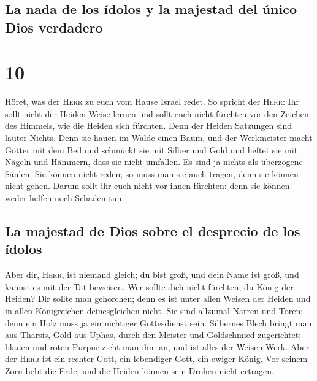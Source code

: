 \hypertarget{la-nada-de-los-uxeddolos-y-la-majestad-del-uxfanico-dios-verdadero}{%
\subsection{La nada de los ídolos y la majestad del único Dios
verdadero}\label{la-nada-de-los-uxeddolos-y-la-majestad-del-uxfanico-dios-verdadero}}

\hypertarget{section-9}{%
\section{10}\label{section-9}}

 Höret, was der \textsc{Herr} zu euch vom Hause Israel
redet.  So spricht der \textsc{Herr}: Ihr sollt nicht der
Heiden Weise lernen und sollt euch nicht fürchten vor den Zeichen des
Himmels, wie die Heiden sich fürchten.  Denn der Heiden
Satzungen sind lauter Nichts. Denn sie hauen im Walde einen Baum, und
der Werkmeister macht Götter mit dem Beil  und schmückt
sie mit Silber und Gold und heftet sie mit Nägeln und Hämmern, dass sie
nicht umfallen.  Es sind ja nichts als überzogene Säulen.
Sie können nicht reden; so muss man sie auch tragen, denn sie können
nicht gehen. Darum sollt ihr euch nicht vor ihnen fürchten: denn sie
können weder helfen noch Schaden tun.

\hypertarget{la-majestad-de-dios-sobre-el-desprecio-de-los-uxeddolos}{%
\subsection{La majestad de Dios sobre el desprecio de los
ídolos}\label{la-majestad-de-dios-sobre-el-desprecio-de-los-uxeddolos}}

 Aber dir, \textsc{Herr}, ist niemand gleich; du bist
groß, und dein Name ist groß, und kannst es mit der Tat beweisen.
 Wer sollte dich nicht fürchten, du König der Heiden? Dir
sollte man gehorchen; denn es ist unter allen Weisen der Heiden und in
allen Königreichen deinesgleichen nicht.  Sie sind
allzumal Narren und Toren; denn ein Holz muss ja ein nichtiger
Gottesdienst sein.  Silbernes Blech bringt man aus
Tharsis, Gold aus Uphas, durch den Meister und Goldschmied zugerichtet;
blauen und roten Purpur zieht man ihm an, und ist alles der Weisen Werk.
 Aber der \textsc{Herr} ist ein rechter Gott, ein
lebendiger Gott, ein ewiger König. Vor seinem Zorn bebt die Erde, und
die Heiden können sein Drohen nicht ertragen.

